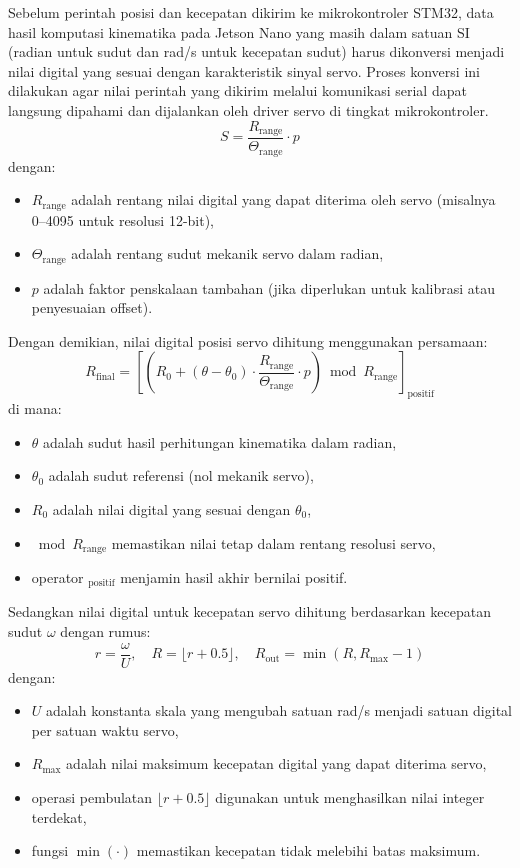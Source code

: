 Sebelum perintah posisi dan kecepatan dikirim ke mikrokontroler STM32, data
hasil komputasi kinematika pada Jetson Nano yang masih dalam satuan SI (radian
untuk sudut dan rad/s untuk kecepatan sudut) harus dikonversi menjadi nilai
digital yang sesuai dengan karakteristik sinyal servo. Proses konversi ini
dilakukan agar nilai perintah yang dikirim melalui komunikasi serial dapat
langsung dipahami dan dijalankan oleh driver servo di tingkat mikrokontroler.
\begin{equation}
S = \frac{R_{\text{range}}}{\Theta_{\text{range}}} \cdot p
\end{equation}
dengan:
\begin{itemize}
  \item $R_{\text{range}}$ adalah rentang nilai digital yang dapat diterima oleh servo (misalnya 0--4095 untuk resolusi 12-bit),
  \item $\Theta_{\text{range}}$ adalah rentang sudut mekanik servo dalam radian,
  \item $p$ adalah faktor penskalaan tambahan (jika diperlukan untuk kalibrasi atau penyesuaian offset).
\end{itemize}
Dengan demikian, nilai digital posisi servo dihitung menggunakan persamaan:
\begin{equation}
R_{\text{final}} = 
\left[
\left( 
R_{0} + (\theta - \theta_{0}) \cdot 
\frac{R_{\text{range}}}{\Theta_{\text{range}}} \cdot p
\right)
\bmod R_{\text{range}}
\right]_{\text{positif}}
\end{equation}
di mana:
\begin{itemize}
  \item $\theta$ adalah sudut hasil perhitungan kinematika dalam radian,
  \item $\theta_{0}$ adalah sudut referensi (nol mekanik servo),
  \item $R_{0}$ adalah nilai digital yang sesuai dengan $\theta_{0}$,
  \item $\bmod R_{\text{range}}$ memastikan nilai tetap dalam rentang resolusi servo,
  \item operator $_{\text{positif}}$ menjamin hasil akhir bernilai positif.
\end{itemize}
Sedangkan nilai digital untuk kecepatan servo dihitung berdasarkan kecepatan sudut $\omega$ dengan rumus:
\begin{equation}
r = \frac{\omega}{U}, \quad
R = \lfloor r + 0.5 \rfloor, \quad
R_{\text{out}} = \min(R, R_{\max}-1)
\end{equation}
dengan:
\begin{itemize}
  \item $U$ adalah konstanta skala yang mengubah satuan rad/s menjadi satuan digital per satuan waktu servo,
  \item $R_{\max}$ adalah nilai maksimum kecepatan digital yang dapat diterima servo,
  \item operasi pembulatan $\lfloor r + 0.5 \rfloor$ digunakan untuk menghasilkan nilai integer terdekat,
  \item fungsi $\min(\cdot)$ memastikan kecepatan tidak melebihi batas maksimum.
\end{itemize}
